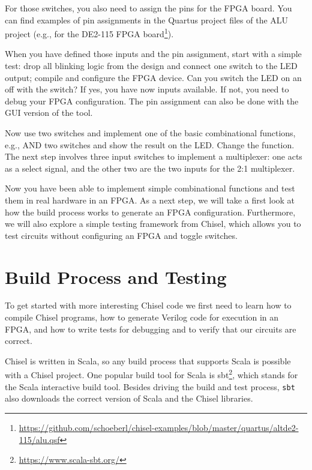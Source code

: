 \documentclass[%
    10pt,
    headinclude, footexclude,
    openright, %
    notitlepage,
    cleardoubleempty,
    headsepline,
    pointlessnumbers,
    bibtotoc, idxtotoc,
    ]{scrbook}
\newcommand{\code}[1]{{\small{\texttt{#1}}}}
\newcommand{\myref}[2]{\href{#1}{#2}}
\renewcommand{\myref}[2]{{#2}{\footnote{\url{#1}}}}
\begin{document}

\noindent For those switches, you also need to assign the pins for the FPGA board.
You can find examples of pin assignments in the Quartus project files of the ALU project
(e.g., for the \myref{https://github.com/schoeberl/chisel-examples/blob/master/quartus/altde2-115/alu.qsf}{DE2-115
FPGA board}).

When you have defined those inputs and the pin assignment, start with a simple test:
drop all blinking logic from the design and connect one switch to the LED output;
compile and configure the FPGA device. Can you switch the LED on an off with the switch?
If yes, you have now inputs available. If not, you need to debug your FPGA configuration.
The pin assignment can also be done with the GUI version of the tool.

Now use two switches and implement one of the basic combinational functions,
e.g., AND two switches and show the result on the LED. Change the function.
The next step involves three input switches to implement a multiplexer: one acts as
a select signal, and the other two are the two inputs for the 2:1 multiplexer.

Now you have been able to implement simple combinational functions and test them
in real hardware in an FPGA. As a next step, we will take a first look at how the build
process works to generate an FPGA configuration. Furthermore, we will also
explore a simple testing framework from Chisel, which allows you to test circuits
without configuring an FPGA and toggle switches.

\chapter{Build Process and Testing}
\label{chap:build:test}

To get started with more interesting Chisel code we first need to learn how to compile
Chisel programs, how to generate Verilog code for execution in an FPGA,
and how to write tests for debugging and to verify that our circuits are correct.

Chisel is written in Scala, so any build process that supports Scala is possible
with a Chisel project. One popular build tool for Scala is \myref{https://www.scala-sbt.org/}{sbt},
which stands for the Scala interactive build tool.
Besides driving the build and test process, \code{sbt} also downloads the correct
version of Scala and the Chisel libraries.
\end{document}
